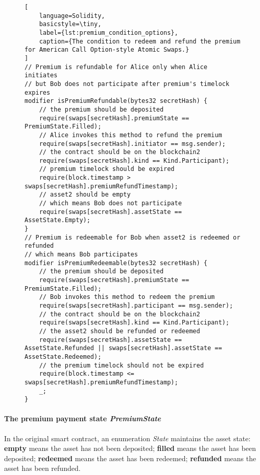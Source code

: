 \begin{figure}[htb]
\begin{lstlisting}[
    language=Solidity, 
    basicstyle=\tiny,
    label={lst:premium_condition_options},
    caption={The condition to redeem and refund the premium for American Call Option-style Atomic Swaps.}
]
// Premium is refundable for Alice only when Alice initiates
// but Bob does not participate after premium's timelock expires
modifier isPremiumRefundable(bytes32 secretHash) {
    // the premium should be deposited
    require(swaps[secretHash].premiumState == PremiumState.Filled);
    // Alice invokes this method to refund the premium
    require(swaps[secretHash].initiator == msg.sender);
    // the contract should be on the blockchain2
    require(swaps[secretHash].kind == Kind.Participant);
    // premium timelock should be expired
    require(block.timestamp > swaps[secretHash].premiumRefundTimestamp);
    // asset2 should be empty
    // which means Bob does not participate
    require(swaps[secretHash].assetState == AssetState.Empty);
}
// Premium is redeemable for Bob when asset2 is redeemed or refunded
// which means Bob participates
modifier isPremiumRedeemable(bytes32 secretHash) {
    // the premium should be deposited
    require(swaps[secretHash].premiumState == PremiumState.Filled);
    // Bob invokes this method to redeem the premium
    require(swaps[secretHash].participant == msg.sender);
    // the contract should be on the blockchain2
    require(swaps[secretHash].kind == Kind.Participant);
    // the asset2 should be refunded or redeemed
    require(swaps[secretHash].assetState == AssetState.Refunded || swaps[secretHash].assetState == AssetState.Redeemed);
    // the premium timelock should not be expired
    require(block.timestamp <= swaps[secretHash].premiumRefundTimestamp);
    _;
}
\end{lstlisting}
\end{figure}

\paragraph{The premium payment state \textit{PremiumState}}

In the original smart contract, an enumeration \textit{State} maintains the asset state:
\textbf{empty} means the asset has not been deposited;
\textbf{filled} means the asset has been deposited;
\textbf{redeemed} means the asset has been redeemed;
\textbf{refunded} means the asset has been refunded.

